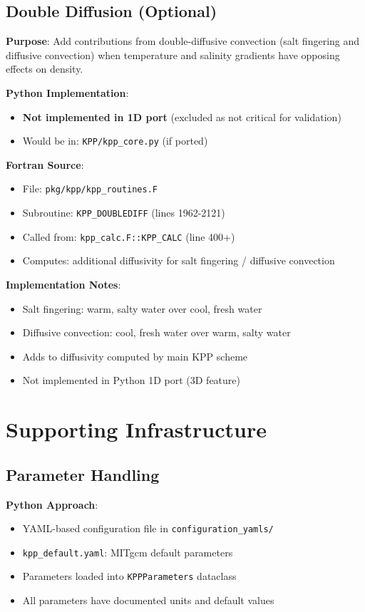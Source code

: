 \documentclass[11pt]{article}
\begin{document}
\subsection{Double Diffusion (Optional)}

\textbf{Purpose}: Add contributions from double-diffusive convection (salt fingering and diffusive convection) when temperature and salinity gradients have opposing effects on density.

\textbf{Python Implementation}:
\begin{itemize}
    \item \textbf{Not implemented in 1D port} (excluded as not critical for validation)
    \item Would be in: \verb|KPP/kpp_core.py| (if ported)
\end{itemize}

\textbf{Fortran Source}:
\begin{itemize}
    \item File: \verb|pkg/kpp/kpp_routines.F|
    \item Subroutine: \verb|KPP_DOUBLEDIFF| (lines 1962-2121)
    \item Called from: \verb|kpp_calc.F::KPP_CALC| (line 400+)
    \item Computes: additional diffusivity for salt fingering / diffusive convection
\end{itemize}

\textbf{Implementation Notes}:
\begin{itemize}
    \item Salt fingering: warm, salty water over cool, fresh water
    \item Diffusive convection: cool, fresh water over warm, salty water
    \item Adds to diffusivity computed by main KPP scheme
    \item Not implemented in Python 1D port (3D feature)
\end{itemize}

\section{Supporting Infrastructure}
\label{sec:infrastructure}

\subsection{Parameter Handling}

\textbf{Python Approach}:
\begin{itemize}
    \item YAML-based configuration file in \verb|configuration_yamls/|
    \item \verb|kpp_default.yaml|: MITgcm default parameters
    \item Parameters loaded into \verb|KPPParameters| dataclass
    \item All parameters have documented units and default values
\end{itemize}
\end{document}
